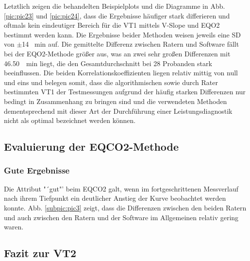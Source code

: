 Letztlich zeigen die behandelten Beispielplots und die Diagramme in Abb. \ref{pic:pic23} und \ref{pic:pic24}, dass die Ergebnisse häufiger stark differieren und oftmals kein eindeutiger Bereich für die VT1 mittels V-Slope und \acs{EQO2} bestimmt werden kann. Die Ergebnisse beider Methoden weisen jeweils eine \acs{SD} von $\pm$14 \si{\per\minute} auf. Die gemittelte Differenz zwischen Ratern und Software fällt bei der \acs{EQO2}-Methode größer aus, was an zwei sehr großen Differenzen mit \SIlist{46,50}{\per\minute} liegt, die den Gesamtdurchschnitt bei 28 Probanden stark beeinflussen. Die beiden Korrelationskoeffizienten liegen relativ mittig von null und eins und belegen somit, dass die algorithmischen sowie durch Rater bestimmten VT1 der Testmessungen aufgrund der häufig starken Differenzen nur bedingt in Zusammenhang zu bringen sind und die verwendeten Methoden dementsprechend mit dieser Art der Durchführung einer Leistungsdiagnostik nicht als optimal bezeichnet werden können.

\subsection{Evaluierung der \acs{EQCO2}-Methode}

\subsubsection{Gute Ergebnisse}

Die Attribut "´gut"' beim \acs{EQCO2} galt, wenn im fortgeschrittenen Messverlauf nach ihrem Tiefpunkt ein deutlicher Anstieg der Kurve beobachtet werden konnte. Abb. \ref{subpic:pic3} zeigt, dass die Differenzen zwischen den beiden Ratern und auch zwischen den Ratern und der Software im Allgemeinen relativ gering waren. 

\subsection{Fazit zur VT2}

